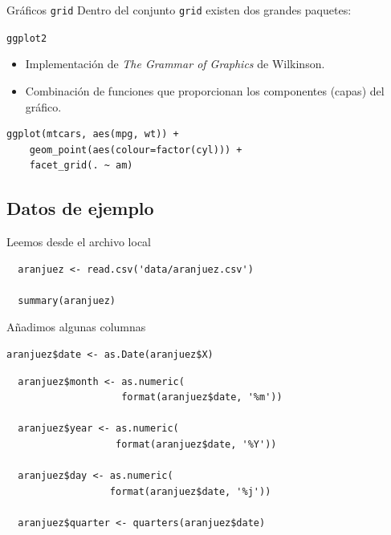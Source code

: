 \documentclass[xcolor={usenames,svgnames,dvipsnames}]{beamer}
\begin{document}
\begin{frame}[fragile,label=sec-1-1-3]{Gráficos \texttt{grid}}
 Dentro del conjunto \texttt{grid} existen dos grandes paquetes:

\begin{block}{\texttt{ggplot2}}
\begin{itemize}
\item Implementación de \emph{The Grammar of Graphics} de Wilkinson.

\item Combinación de funciones que proporcionan los componentes (capas) del gráfico.
\end{itemize}

\lstset{language=R,label= ,caption= ,numbers=none}
\begin{lstlisting}
ggplot(mtcars, aes(mpg, wt)) +
    geom_point(aes(colour=factor(cyl))) +
    facet_grid(. ~ am)
\end{lstlisting}
\end{block}
\end{frame}

\subsection{Datos de ejemplo}
\label{sec-1-2}
\begin{frame}[fragile,label=sec-1-2-1]{Leemos desde el archivo local}
 \lstset{language=R,label= ,caption= ,numbers=none}
\begin{lstlisting}
  aranjuez <- read.csv('data/aranjuez.csv')

  summary(aranjuez)
\end{lstlisting}
\end{frame}

\begin{frame}[fragile,label=sec-1-2-2]{Añadimos algunas columnas}
 \lstset{language=R,label= ,caption= ,numbers=none}
\begin{lstlisting}
aranjuez$date <- as.Date(aranjuez$X)
\end{lstlisting}
\lstset{language=R,label= ,caption= ,numbers=none}
\begin{lstlisting}
  aranjuez$month <- as.numeric(
                    format(aranjuez$date, '%m'))

  aranjuez$year <- as.numeric(
                   format(aranjuez$date, '%Y'))

  aranjuez$day <- as.numeric(
                  format(aranjuez$date, '%j'))

  aranjuez$quarter <- quarters(aranjuez$date)
\end{lstlisting}
\end{frame}
\end{document}
